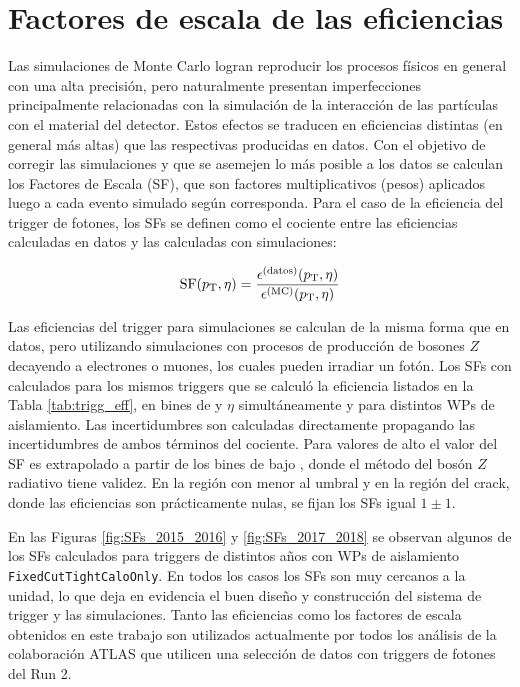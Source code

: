 \section{Factores de escala de las eficiencias}\label{sec:trig_sf}

Las simulaciones de Monte Carlo logran reproducir los procesos físicos en general con una alta precisión, pero naturalmente presentan imperfecciones principalmente relacionadas con la simulación de la interacción de las partículas con el material del detector. Estos efectos se traducen en eficiencias distintas (en general más altas) que las respectivas producidas en datos. Con el objetivo de corregir las simulaciones y que se asemejen lo más posible a los datos se calculan los Factores de Escala (SF), que son factores multiplicativos (pesos) aplicados luego a cada evento simulado según corresponda. Para el caso de la eficiencia del trigger de fotones, los SFs se definen como el cociente entre las eficiencias calculadas en datos y las calculadas con simulaciones:

\begin{equation}
	\text{SF}(p_{\text{T}}, \eta) = \frac{\epsilon^{\text{(datos)}}(p_{\text{T}}, \eta)}{\epsilon^{\text{(MC)}}(p_{\text{T}}, \eta)}
\end{equation}

Las eficiencias del trigger para simulaciones se calculan de la misma forma que en datos, pero utilizando simulaciones con procesos de producción de bosones $Z$ decayendo a electrones o muones, los cuales pueden irradiar un fotón. Los SFs con calculados para los mismos triggers que se calculó la eficiencia listados en la Tabla \ref{tab:trigg_eff}, en bines de \ET y $\eta$ simultáneamente y para distintos WPs de aislamiento. Las incertidumbres son calculadas directamente propagando las incertidumbres de ambos términos del cociente. Para valores de alto \ET el valor del SF es extrapolado a partir de los bines de bajo \ET, donde el método del bosón $Z$ radiativo tiene validez. En la región con \ET menor al umbral y en la región del crack, donde las eficiencias son prácticamente nulas, se fijan los SFs igual $1\pm1$. 
 
En las Figuras \ref{fig:SFs_2015_2016} y \ref{fig:SFs_2017_2018} se observan algunos de los SFs calculados para triggers de distintos años con WPs de aislamiento \texttt{FixedCutTightCaloOnly}. 
En todos los casos los SFs son muy cercanos a la unidad, lo que deja en evidencia el buen diseño y construcción del sistema de trigger y las simulaciones. Tanto las eficiencias como los factores de escala obtenidos en este trabajo son utilizados actualmente por todos los análisis de la colaboración ATLAS que utilicen una selección de datos con triggers de fotones del Run 2.

